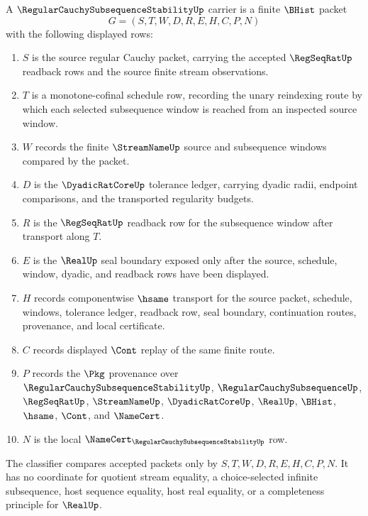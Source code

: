 \begin{definition}
\label{def:regular-cauchy-subsequence-stability-carrier}
A $\RegularCauchySubsequenceStabilityUp$ carrier is a finite $\BHist$ packet
$$
G=(S,T,W,D,R,E,H,C,P,N)
$$
with the following displayed rows:
\begin{enumerate}
\item $S$ is the source regular Cauchy packet, carrying the accepted $\RegSeqRatUp$ readback rows and the source finite stream observations.
\item $T$ is a monotone-cofinal schedule row, recording the unary reindexing route by which each selected subsequence window is reached from an inspected source window.
\item $W$ records the finite $\StreamNameUp$ source and subsequence windows compared by the packet.
\item $D$ is the $\DyadicRatCoreUp$ tolerance ledger, carrying dyadic radii, endpoint comparisons, and the transported regularity budgets.
\item $R$ is the $\RegSeqRatUp$ readback row for the subsequence window after transport along $T$.
\item $E$ is the $\RealUp$ seal boundary exposed only after the source, schedule, window, dyadic, and readback rows have been displayed.
\item $H$ records componentwise $\hsame$ transport for the source packet, schedule, windows, tolerance ledger, readback row, seal boundary, continuation routes, provenance, and local certificate.
\item $C$ records displayed $\Cont$ replay of the same finite route.
\item $P$ records the $\Pkg$ provenance over $\RegularCauchySubsequenceStabilityUp$, $\RegularCauchySubsequenceUp$, $\RegSeqRatUp$, $\StreamNameUp$, $\DyadicRatCoreUp$, $\RealUp$, $\BHist$, $\hsame$, $\Cont$, and $\NameCert$.
\item $N$ is the local $\NameCert_{\RegularCauchySubsequenceStabilityUp}$ row.
\end{enumerate}
The classifier compares accepted packets only by $S,T,W,D,R,E,H,C,P,N$. It has no coordinate for quotient stream equality, a choice-selected infinite subsequence, host sequence equality, host real equality, or a completeness principle for $\RealUp$.
\end{definition}

